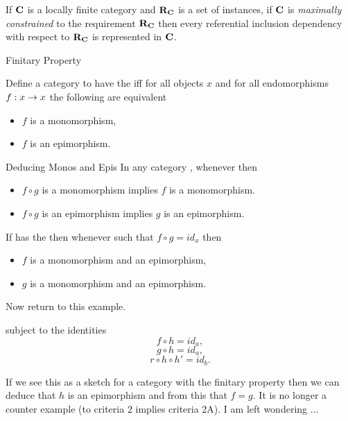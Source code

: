 \documentclass[xcolor=pst,dvips]{beamer}   %
\begin{document}
\begin{frame}
\begin{lemma}
If $\textbf{C}$ is a locally finite category and $\textbf{R}_{\textbf{C}}$ is a set of instances, if $\textbf{C}$ is 
\textit{maximally constrained} to the requirement $\textbf{R}_{\textbf{C}}$ then
every referential inclusion dependency with respect to $\textbf{R}_{\textbf{C}}$ is represented in $\textbf{C}$.
\end{lemma}
\end{frame}

\begin{frame}{Finitary Property}
\begin{definition}
Define a category \catcw to have the  iff for all objects $x$ and for all endomorphisms 
$f: x \rightarrow x$ the following are equivalent
\begin{itemize}
\item $f$ is a monomorphism,
\item $f$ is an epimorphism.
\end{itemize}
\end{definition}
\end{frame}

\begin{frame}{Deducing Monos and Epis}
In any category \catcw, whenever  then
\begin{itemize}
\item $f \circ g$ is a monomorphism implies $f$ is a monomorphism.
\item $f \circ g$ is an epimorphism implies $g$ is an epimorphism.
\end{itemize}
\medskip
If \catcw has the  then whenever  
such that $f \circ g = id_x$ then
\begin{itemize}
\item $f$ is a monomorphism and an epimorphism,
\item $g$ is a monomorphism and an epimorphism.
\end{itemize}
\end{frame}

\begin{frame}
Now return to this example.

subject to the identities
\begin{equation}
\label{fhidentity}
f \circ h = id_a,
\end{equation}
\begin{equation}
\label{ghidentity}
g \circ h = id_a,
\end{equation}
\begin{equation}
\label{rhhpidentity}
r \circ h \circ h' = id_b.
\end{equation}

If we see this as a sketch for a category with the finitary property then we can deduce that $h$ is an epimorphism
and from this that $f=g$.  It is no longer a counter example (to criteria 2 implies criteria 2A).
\medskip
I am left wondering ...  
\end{frame}

\iffalse
\begin{frame}{Bibliography}

\end{frame}
\fi

\end{document}
